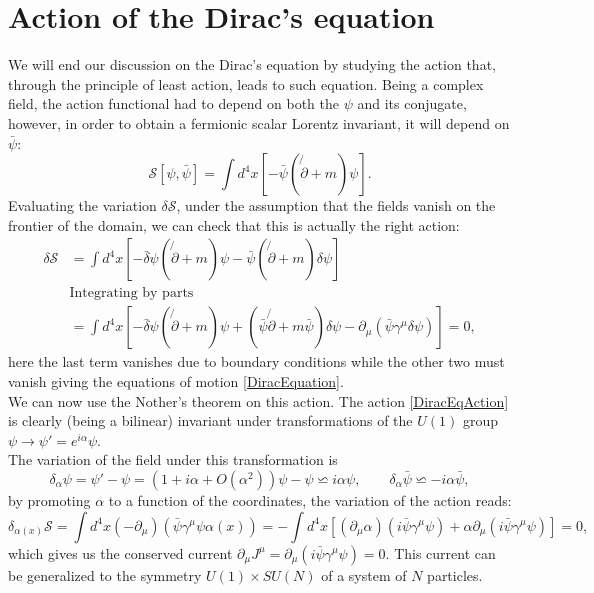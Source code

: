 \section{Action of the Dirac's equation}
We will end our discussion on the Dirac's equation by studying the action that, through the principle of least action, leads to such equation. Being a complex field, the action functional had to depend on both the $\psi$ and its conjugate, however, in order to obtain a fermionic scalar Lorentz invariant, it will depend on $\bar\psi$:
\begin{equation}
    \mathcal{S} [\psi,\bar\psi]=\int d^4x[-\bar\psi(\not{\partial}+m)\psi].\label{DiracEqAction}
\end{equation}
Evaluating the variation $\delta\mathcal{S} $, under the assumption that the fields vanish on the frontier of the domain, we can check that this is actually the right action:
\begin{align*}
    \delta\mathcal{S} &=\int d^4x[-\bar\delta\psi(\not{\partial}+m)\psi-\bar\psi(\not{\partial}+m)\delta\psi]\\
    &\text{Integrating by parts}\\
    &=\int d^4x[-\bar\delta\psi(\not{\partial}+m)\psi+(\bar\psi\not{\partial}+m\bar\psi)\delta\psi-\partial_\mu(\bar\psi\gamma^\mu\delta\psi)]=0,
\end{align*}
here the last term vanishes due to boundary conditions while the other two must vanish giving the equations of motion \eqref{DiracEquation}.\\

We can now use the Nother's theorem on this action. The action \eqref{DiracEqAction} is clearly (being a bilinear) invariant under transformations of the $U(1)$ group $\psi\rightarrow\psi'=e^{i\alpha}\psi$.\\
The variation of the field under this transformation is
\begin{equation*}
    \delta_\alpha\psi=\psi'-\psi=(1+i\alpha+O(\alpha^2))\psi-\psi\backsimeq  i\alpha\psi,\qquad \delta_\alpha\bar\psi\backsimeq  -i\alpha\bar\psi,
\end{equation*}
by promoting $\alpha$ to a function of the coordinates, the variation of the action reads:
\begin{equation*}
    \delta_{\alpha(x)}\mathcal{S}=\int d^4x(-\partial_\mu)(\bar\psi\gamma^\mu\psi\alpha(x))=-\int d^4x[(\partial_\mu\alpha)(i\bar\psi\gamma^\mu\psi)+\alpha\partial_\mu(i\bar\psi\gamma^\mu\psi)]=0,
\end{equation*}
which gives us the conserved current $\partial_\mu J^\mu=\partial_\mu(i\bar\psi\gamma^\mu\psi)=0$.
This current can be generalized to the symmetry $U(1)\times SU(N)$ of a system of $N$ particles.\\

